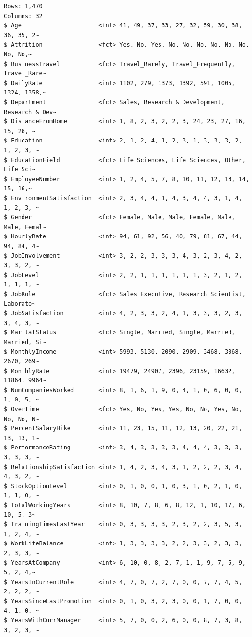 \documentclass[
  letterpaper,
  DIV=11,
  numbers=noendperiod]{scrreprt}
\theoremstyle{definition}
\theoremstyle{remark}
\begin{document}
\begin{verbatim}
Rows: 1,470
Columns: 32
$ Age                      <int> 41, 49, 37, 33, 27, 32, 59, 30, 38, 36, 35, 2~
$ Attrition                <fct> Yes, No, Yes, No, No, No, No, No, No, No, No,~
$ BusinessTravel           <fct> Travel_Rarely, Travel_Frequently, Travel_Rare~
$ DailyRate                <int> 1102, 279, 1373, 1392, 591, 1005, 1324, 1358,~
$ Department               <fct> Sales, Research & Development, Research & Dev~
$ DistanceFromHome         <int> 1, 8, 2, 3, 2, 2, 3, 24, 23, 27, 16, 15, 26, ~
$ Education                <int> 2, 1, 2, 4, 1, 2, 3, 1, 3, 3, 3, 2, 1, 2, 3, ~
$ EducationField           <fct> Life Sciences, Life Sciences, Other, Life Sci~
$ EmployeeNumber           <int> 1, 2, 4, 5, 7, 8, 10, 11, 12, 13, 14, 15, 16,~
$ EnvironmentSatisfaction  <int> 2, 3, 4, 4, 1, 4, 3, 4, 4, 3, 1, 4, 1, 2, 3, ~
$ Gender                   <fct> Female, Male, Male, Female, Male, Male, Femal~
$ HourlyRate               <int> 94, 61, 92, 56, 40, 79, 81, 67, 44, 94, 84, 4~
$ JobInvolvement           <int> 3, 2, 2, 3, 3, 3, 4, 3, 2, 3, 4, 2, 3, 3, 2, ~
$ JobLevel                 <int> 2, 2, 1, 1, 1, 1, 1, 1, 3, 2, 1, 2, 1, 1, 1, ~
$ JobRole                  <fct> Sales Executive, Research Scientist, Laborato~
$ JobSatisfaction          <int> 4, 2, 3, 3, 2, 4, 1, 3, 3, 3, 2, 3, 3, 4, 3, ~
$ MaritalStatus            <fct> Single, Married, Single, Married, Married, Si~
$ MonthlyIncome            <int> 5993, 5130, 2090, 2909, 3468, 3068, 2670, 269~
$ MonthlyRate              <int> 19479, 24907, 2396, 23159, 16632, 11864, 9964~
$ NumCompaniesWorked       <int> 8, 1, 6, 1, 9, 0, 4, 1, 0, 6, 0, 0, 1, 0, 5, ~
$ OverTime                 <fct> Yes, No, Yes, Yes, No, No, Yes, No, No, No, N~
$ PercentSalaryHike        <int> 11, 23, 15, 11, 12, 13, 20, 22, 21, 13, 13, 1~
$ PerformanceRating        <int> 3, 4, 3, 3, 3, 3, 4, 4, 4, 3, 3, 3, 3, 3, 3, ~
$ RelationshipSatisfaction <int> 1, 4, 2, 3, 4, 3, 1, 2, 2, 2, 3, 4, 4, 3, 2, ~
$ StockOptionLevel         <int> 0, 1, 0, 0, 1, 0, 3, 1, 0, 2, 1, 0, 1, 1, 0, ~
$ TotalWorkingYears        <int> 8, 10, 7, 8, 6, 8, 12, 1, 10, 17, 6, 10, 5, 3~
$ TrainingTimesLastYear    <int> 0, 3, 3, 3, 3, 2, 3, 2, 2, 3, 5, 3, 1, 2, 4, ~
$ WorkLifeBalance          <int> 1, 3, 3, 3, 3, 2, 2, 3, 3, 2, 3, 3, 2, 3, 3, ~
$ YearsAtCompany           <int> 6, 10, 0, 8, 2, 7, 1, 1, 9, 7, 5, 9, 5, 2, 4,~
$ YearsInCurrentRole       <int> 4, 7, 0, 7, 2, 7, 0, 0, 7, 7, 4, 5, 2, 2, 2, ~
$ YearsSinceLastPromotion  <int> 0, 1, 0, 3, 2, 3, 0, 0, 1, 7, 0, 0, 4, 1, 0, ~
$ YearsWithCurrManager     <int> 5, 7, 0, 0, 2, 6, 0, 0, 8, 7, 3, 8, 3, 2, 3, ~
\end{verbatim}
\end{document}
